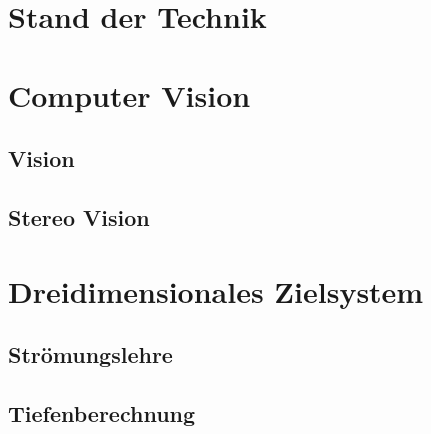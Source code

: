 
\section{Stand der Technik}

\section{Computer Vision}

\subsection{Vision}

\subsection{Stereo Vision}

\section{Dreidimensionales Zielsystem}

\subsection{Strömungslehre}

\subsection{Tiefenberechnung}
